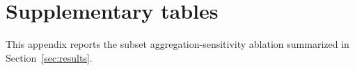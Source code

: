 \appendix
\section{Supplementary tables}\label{app:tables}
This appendix reports the subset aggregation-sensitivity ablation summarized in Section~\ref{sec:results}.


\FloatBarrier
